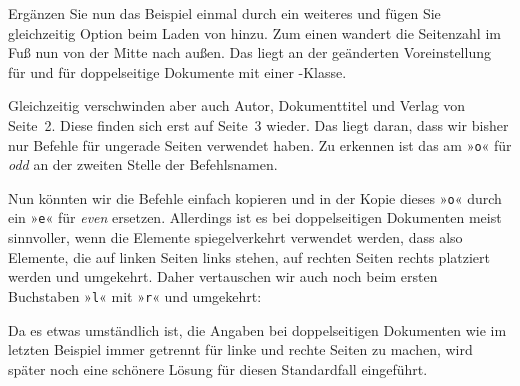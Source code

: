 \begin{Example}
  Ergänzen Sie nun das Beispiel einmal durch ein weiteres  und
  fügen Sie gleichzeitig Option
   beim Laden
  von  hinzu. Zum einen wandert die Seitenzahl im Fuß nun von
  der Mitte nach außen. Das liegt an der geänderten Voreinstellung für
   und
   für doppelseitige Dokumente
  mit einer \KOMAScript-Klasse.

  Gleichzeitig verschwinden aber auch Autor, Dokumenttitel und Verlag von
  Seite~2. Diese finden sich erst auf Seite~3 wieder. Das liegt daran, dass
  wir bisher nur Befehle für ungerade Seiten
  verwendet haben. Zu erkennen ist das am »\texttt{o}« für \emph{odd} an der
  zweiten Stelle der Befehlsnamen.

  Nun könnten wir die Befehle einfach kopieren und in der Kopie dieses
  »\texttt{o}« durch ein »\texttt{e}« für \emph{even}
  ersetzen. Allerdings ist es bei doppelseitigen Dokumenten meist sinnvoller,
  wenn die Elemente spiegelverkehrt verwendet werden, dass also Elemente, die
  auf linken Seiten links stehen, auf rechten Seiten rechts platziert werden
  und umgekehrt. Daher vertauschen wir auch noch beim ersten Buchstaben
  »\texttt{l}« mit »\texttt{r}« und umgekehrt:
\end{Example}%

Da es etwas umständlich ist, die Angaben bei doppelseitigen Dokumenten wie im
letzten Beispiel immer getrennt für linke und rechte Seiten zu machen, wird
später noch eine schönere Lösung für diesen Standardfall eingeführt.

